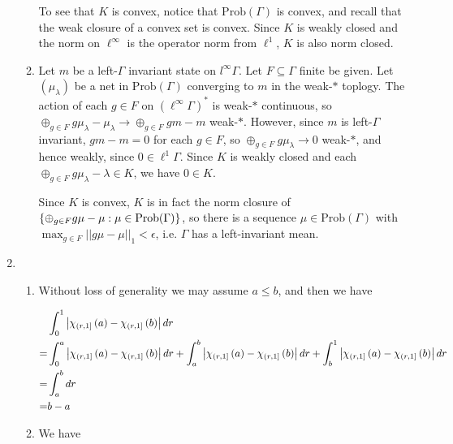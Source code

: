 \documentclass[a4paper,10pt]{report}
\newcommand{\pn}[2]{||#1||_{#2}}
\DeclarePairedDelimiter{\set}{\{}{\}}
\begin{document}
\begin{enumerate}
\begin{enumerate}
				To see that $K$ is convex, notice that $\text{Prob}(\Gamma)$ is convex, and recall that the weak closure of a convex set is convex. Since $K$ is weakly closed and the norm on $\ell^\infty$ is the operator norm from $\ell^1$, $K$ is also norm closed. 
				
			\item Let $m$ be a left-$\Gamma$ invariant state on $l^\infty\Gamma$. Let $F\subseteq\Gamma$ finite be given. Let $(\mu_\lambda)$ be a net in $\text{Prob}(\Gamma)$ converging to $m$ in the weak-$*$ toplogy. The action of each $g\in F$ on $(\ell^\infty\Gamma)^*$ is weak-$*$ continuous, so $\oplus_{g\in F}g\mu_\lambda-\mu_\lambda\to\oplus_{g\in F}gm-m$ weak-$*$. However, since $m$ is left-$\Gamma$ invariant, $gm-m=0$ for each $g\in F$, so $\oplus_{g\in F}g\mu_\lambda\to 0$ weak-$*$, and hence weakly, since $0\in\ell^1\Gamma$. Since $K$ is weakly closed and each $\oplus_{g\in F}g\mu_\lambda-\lambda\in K$, we have $0\in K$. 
				
				Since $K$ is convex, $K$ is in fact the norm closure of $\set{\oplus_{g\in F}g\mu-\mu:\mu\in\text{Prob}(\Gamma)}$, so there is a sequence $\mu\in\text{Prob}(\Gamma)$ with $\max_{g\in F}\pn{g\mu-\mu}{1}<\epsilon$, i.e. $\Gamma$ has a left-invariant mean. 
		\end{enumerate}
	\item
		\begin{enumerate}
		\item Without loss of generality we may assume $a \leq b$, and then we have

                  \begin{align*}
                    &\int_0^1 \left| \chi_{\left( r , 1 \right]} \left( a \right) - \chi_{\left( r , 1 \right]} \left( b \right) \right| dr\\
                    =& \int_0^a \left| \chi_{\left( r , 1 \right]} \left( a \right) - \chi_{\left( r , 1 \right]} \left( b \right) \right| dr + \int_a^b \left| \chi_{\left( r , 1 \right]} \left( a \right) - \chi_{\left( r , 1 \right]} \left( b \right) \right| dr + \int_b^1 \left| \chi_{\left( r , 1 \right]} \left( a \right) - \chi_{\left( r , 1 \right]} \left( b \right) \right| dr\\
                    =& \int_a^b dr\\
                    =& b - a
                  \end{align*}

		\item We have


\end{enumerate}
\end{enumerate}
\end{document}
